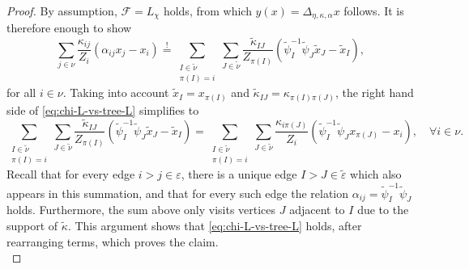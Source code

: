 \documentclass[10pt,reqno]{amsart}
\numberwithin{equation}{section}
\theoremstyle{bfnote}
\theoremstyle{bfdef}
\newcommand{\mc}[1]{\mathcal{#1}}
\newcommand{\veps}{\varepsilon}
\providecommand\x; %
\renewcommand{\x}{x}
\begin{document}
\begin{proof}
		By assumption, $\mc{F} = L_\chi$ holds, from which $y(x) = \Delta_{\eta,\kappa,\alpha}x$ follows. It is therefore enough to show
		\begin{equation}\label{eq:chi-L-vs-tree-L}
			\sum_{j \in \nu} \frac{\kappa_{ij}}{Z_{i}}(\alpha_{ij}x_{j} - x_{i})
			\overset{!}{=}
			\sum_{\substack{I\in \tilde\nu \\ \pi(I) = i}} \sum_{J\in \tilde\nu} \frac{\tilde\kappa_{IJ}}{Z_{\pi(I)}} (\tilde{\psi}_I^{-1}\tilde{\psi}_{J} \tilde\x_{J} -\tilde\x_{I}),
		\end{equation}
		for all $i \in \nu$. 
		Taking into account $\tilde\x_{I} = x_{\pi(I)}$ and $\tilde\kappa_{IJ} = \kappa_{\pi(I)\pi(J)}$, the right hand side of \eqref{eq:chi-L-vs-tree-L} simplifies to
		\begin{equation}
			\sum_{\substack{I\in \tilde\nu \\ \pi(I) = i}} \sum_{J\in \tilde\nu} \frac{\tilde\kappa_{IJ}}{Z_{\pi(I)}} (\tilde{\psi}_I^{-1}\tilde{\psi}_{J} \tilde\x_{J} -\tilde\x_{I})
			=
			\sum_{\substack{I\in \tilde\nu \\ \pi(I) = i}} \sum_{J \in \tilde \nu}
			\frac{\kappa_{i\pi(J)}}{Z_{i}}
			(\tilde\psi_{I}^{-1}\tilde\psi_{J}\x_{\pi(J)} - \x_i), \quad \forall i \in \nu.
		\end{equation}
		Recall that for every edge $i>j\in \veps$, there is a unique edge $I>J\in \tilde\veps$ which also appears in this summation, and that for every such edge the relation $\alpha_{ij} = \tilde\psi_{I}^{-1}\tilde\psi_{J}$ holds. Furthermore, the sum above only visits vertices $J$ adjacent to $I$ due to the support of $\tilde\kappa$. This argument shows that \eqref{eq:chi-L-vs-tree-L} holds, after rearranging terms, which proves the claim.\\[2mm]


\end{proof}
\end{document}
